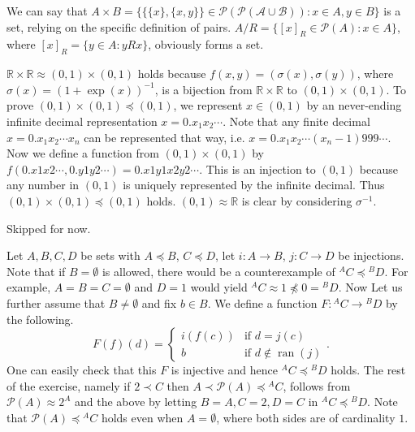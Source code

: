 \documentclass[12pt]{article}
\newcommand{\ran}{\mathop{\mathrm{ran}}}
\theoremstyle{definition}
\newenvironment{customthm}[1]
  {\renewcommand\theinnercustomthm{#1}\innercustomthm}
  {\endinnercustomthm}
\begin{document}
\begin{customthm}{I.10.5} We can say that $A\times B=\{\{\{x\},\{x,y\}\}\in\mathcal{P(\mathcal{P(A\cup B)})}:x\in A,y\in B\}$ is a set, relying on the specific definition of pairs. $A/R=\{[x]_R\in\mathcal{P}(A):x\in A\}$, where $[x]_R=\{y\in A:yRx\}$, obviously forms a set.
\end{customthm}

\begin{customthm}{I.11.3} $\mathbb{R}\times\mathbb{R}\approx(0,1)\times(0,1)$ holds because $f(x,y)=(\sigma(x),\sigma(y))$, where $\sigma(x)=(1+\exp(x))^{-1}$, is a bijection from $\mathbb{R}\times\mathbb{R}$ to $(0,1)\times(0,1)$. To prove $(0,1)\times(0,1)\preccurlyeq(0,1)$, we represent $x\in(0,1)$ by an never-ending infinite decimal representation $x=0.x_1x_2\cdots$. Note that any finite decimal $x=0.x_1x_2\cdots x_n$ can be represented that way, i.e. $x=0.x_1x_2\cdots(x_n-1)999\cdots$. Now we define a function from $(0,1)\times(0,1)$ by $f(0.x1x2\cdots, 0.y1y2\cdots) = 0.x1y1x2y2\cdots$. This is an injection to $(0,1)$ because any number in $(0,1)$ is uniquely represented by the infinite decimal. Thus $(0,1)\times(0,1)\preccurlyeq(0,1)$ holds. $(0,1)\approx\mathbb{R}$ is clear by considering $\sigma^{-1}$.
\end{customthm}

\begin{customthm}{I.11.6} Skipped for now.
\end{customthm}

\begin{customthm}{I.11.12} Let $A,B,C,D$ be sets with $A\preccurlyeq B$, $C\preccurlyeq D$, let $i:A\rightarrow B$, $j:C\rightarrow D$ be injections. Note that if $B=\emptyset$ is allowed, there would be a counterexample of ${}^AC\preccurlyeq{}^BD$. For example, $A=B=C=\emptyset$ and $D=1$ would yield ${}^AC\approx 1\not\preccurlyeq 0={}^BD$. Now Let us further assume that $B\neq\emptyset$ and fix $b\in B$. We define a function $F:{}^AC\rightarrow{}^BD$ by the following.
\[F(f)(d)=
  \begin{cases}
    i(f(c)) & \text{if } d=j(c) \\
    b & \text{if } d\not\in\ran(j)
  \end{cases}.
\]
One can easily check that this $F$ is injective and hence ${}^AC\preccurlyeq{}^BD$ holds. The rest of the exercise, namely if $2\prec C$ then $A\prec \mathcal{P}(A)\preccurlyeq{}^AC$, follows from $\mathcal{P}(A)\approx 2^A$ and the above by letting $B=A, C=2, D=C$ in ${}^AC\preccurlyeq{}^BD$. Note that $\mathcal{P}(A)\preccurlyeq{}^AC$ holds even when $A=\emptyset$, where both sides are of cardinality $1$.
\end{customthm}
\end{document}
